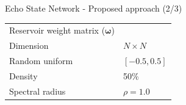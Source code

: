 \documentclass[aspectratio=169]{beamer}
\begin{document}
\begin{frame}[t]{Echo State Network - Proposed approach (2/3)}
\begin{minipage}[t]{0.7\textwidth}
\begin{table}[ht]
\begin{tabular}{ll}
				\midrule
				Reservoir weight matrix ($\boldsymbol{\omega}$)     &                                      \\
				\hspace{2.5mm} Dimension                            & $N \times N$                         \\
				\hspace{2.5mm} Random uniform                       & $[-0.5, 0.5]$                        \\
				\hspace{2.5mm} Density                              & 50\%                                 \\
				\hspace{2.5mm} Spectral radius                      & $\rho = 1.0$                         \\
				\bottomrule
				\end{tabular}
			\end{table}
    \end{minipage}
\end{frame}
\end{document}

